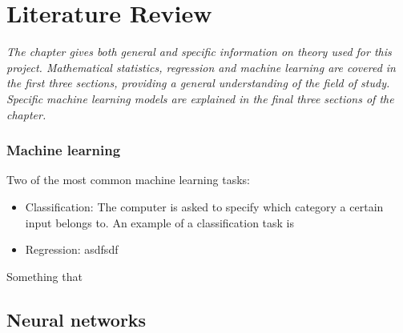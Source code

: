 \chapter{Literature Review}
\emph{The chapter gives both general and specific information on theory used for this project.  Mathematical statistics, regression and machine learning are covered in the first three sections, providing a general understanding of the field of study. Specific machine learning models are explained in the final three sections of the chapter. }

\subsection{Machine learning}
	
	Two of the most common machine learning tasks: 
	\begin{itemize}
		\item{Classification:} The computer is asked to specify which category a certain input belongs to. An example of a classification task is  
		\item{Regression:} asdfsdf
	\end{itemize} \cite{BOOK:1}
	Something that \cite{WEBSITE:1}
\section{Neural networks}


